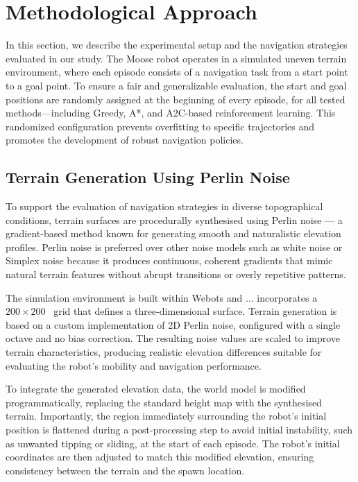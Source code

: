 \documentclass[conference]{IEEEtran}
\begin{document}
\section{Methodological Approach}

In this section, we describe the experimental setup and the navigation strategies evaluated in our study. The Moose robot operates in a simulated uneven terrain environment, where each episode consists of a navigation task from a start point to a goal point. To ensure a fair and generalizable evaluation, the start and goal positions are randomly assigned at the beginning of every episode, for all tested methods—including Greedy, A*, and A2C-based reinforcement learning. This randomized configuration prevents overfitting to specific trajectories and promotes the development of robust navigation policies.

\subsection{Terrain Generation Using Perlin Noise}

To support the evaluation of navigation strategies in diverse topographical conditions, terrain surfaces are procedurally synthesised using Perlin noise — a gradient-based method known for generating smooth and naturalistic elevation profiles. Perlin noise is preferred over other noise models such as white noise or Simplex noise because it produces continuous, coherent gradients that mimic natural terrain features without abrupt transitions or overly repetitive patterns.

The simulation environment is built within Webots and ... incorporates a \(200 \times 200\)~ grid that defines a three-dimensional surface. Terrain generation is based on a custom implementation of 2D Perlin noise, configured with a single octave and no bias correction. The resulting noise values are scaled to improve terrain characteristics, producing realistic elevation differences suitable for evaluating the robot's mobility and navigation performance.

To integrate the generated elevation data, the world model is modified programmatically, replacing the standard height map with the synthesised terrain. Importantly, the region immediately surrounding the robot's initial position is flattened during a post-processing step to avoid initial instability, such as unwanted tipping or sliding, at the start of each episode. The robot's initial coordinates are then adjusted to match this modified elevation, ensuring consistency between the terrain and the spawn location.
\end{document}
